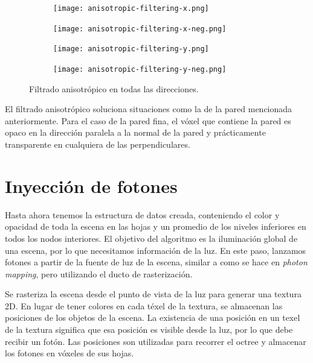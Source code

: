 \begin{figure}
    \begin{center}
        \begin{subfigure}{.24\textwidth}
            \texttt{[image: anisotropic-filtering-x.png]}
        \end{subfigure}
        \begin{subfigure}{.24\textwidth}
            \texttt{[image: anisotropic-filtering-x-neg.png]}
        \end{subfigure}
        \begin{subfigure}{.24\textwidth}
            \texttt{[image: anisotropic-filtering-y.png]}
        \end{subfigure}
        \begin{subfigure}{.24\textwidth}
            \texttt{[image: anisotropic-filtering-y-neg.png]}
        \end{subfigure}
    \end{center}
    \caption{Filtrado anisotrópico en todas las direcciones.}
    \label{fig:svo_filtering_anisotropic}
\end{figure}

El filtrado anisotrópico soluciona situaciones como la de la pared mencionada anteriormente.
Para el caso de la pared fina, el vóxel que contiene la pared es opaco en la dirección paralela a la normal de la pared y prácticamente transparente en cualquiera de las perpendiculares.

\section{Inyección de fotones}\label{sec:photon-injection}

Hasta ahora tenemos la estructura de datos creada, conteniendo el color y opacidad de toda la escena en las hojas y un promedio de los niveles inferiores en todos los nodos interiores.
El objetivo del algoritmo es la iluminación global de una escena, por lo que necesitamos información de la luz.
En este paso, lanzamos fotones a partir de la fuente de luz de la escena, similar a como se hace en \textit{photon mapping}, pero utilizando el ducto de rasterización.

Se rasteriza la escena desde el punto de vista de la luz para generar una textura 2D.
En lugar de tener colores en cada téxel de la textura, se almacenan las posiciones de los objetos de la escena.
La existencia de una posición en un texel de la textura significa que esa posición es visible desde la luz, por lo que debe recibir un fotón.
Las posiciones son utilizadas para recorrer el octree y almacenar los fotones en vóxeles de sus hojas.

